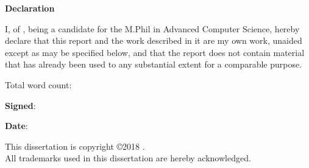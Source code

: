 \newpage
{\Huge \bf Declaration}

\vspace{24pt}

I, \authorname of \authorcollege, being a candidate for the M.Phil in
Advanced Computer Science, hereby declare that this report and the
work described in it are my own work, unaided except as may be
specified below, and that the report does not contain material that
has already been used to any substantial extent for a comparable
purpose.

\vspace{24pt}
Total word count: \wordcount

\vspace{60pt}
\textbf{Signed}:

\vspace{12pt}
\textbf{Date}:


\vfill

This dissertation is copyright \copyright 2018 \authorname.
\\
All trademarks used in this dissertation are hereby acknowledged.



\newpage
\vspace*{\fill}
